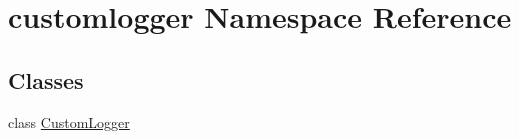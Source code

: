 \hypertarget{namespacecustomlogger}{}\section{customlogger Namespace Reference}
\label{namespacecustomlogger}
\subsection*{Classes}
\begin{DoxyCompactItemize}
\item 
class \hyperlink{classcustomlogger_1_1CustomLogger}{Custom\+Logger}
\end{DoxyCompactItemize}
